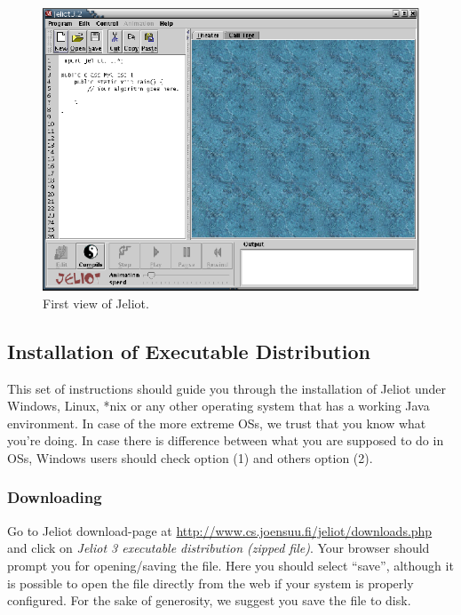 \documentclass[a4paper,11pt,english]{article}
\newcommand{\jel}{Jeliot}
\begin{document}
\begin{figure}[ht]
\begin{center}
\includegraphics{images/startup.eps}
\caption{\label{fig:startup}First view of \jel{}.}
\end{center}
\end{figure}


\subsection{\label{geninst}Installation of Executable Distribution}

This set of instructions should guide you through the installation of \jel{} under Windows, Linux, *nix or any other operating system that has a working Java environment. In case of the more extreme OSs, we trust that you know what you're doing. In case there is difference between what you are supposed to do in OSs, Windows users should check option (1) and others option (2).

\subsubsection{Downloading}
Go to \jel{} download-page at \url{http://www.cs.joensuu.fi/jeliot/downloads.php} and click on \emph{\jel{} 3 executable distribution (zipped file)}. Your browser should prompt you for opening/saving the file. Here you should select ``save'', although it is possible to open the file directly from the web if your system is properly configured. For the sake of generosity, we suggest you save the file to disk. 
\end{document}
